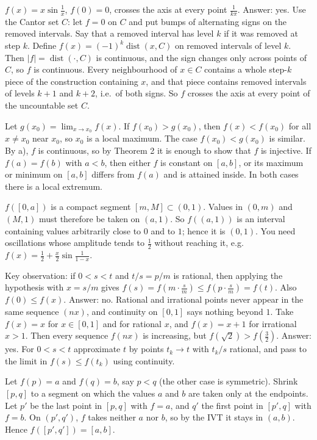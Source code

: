 \documentclass[11pt,a4paper]{article}
\begin{document}
 $f(x)=x\sin\frac1x$, $f(0)=0$, crosses the axis at every point $\frac1{k\pi}$.
 Answer: yes. Use the Cantor set $C$: let $f=0$ on $C$ and put bumps of alternating signs on the removed intervals.
 Say that a removed interval has level $k$ if it was removed at step $k$. Define $f(x)=(-1)^k\operatorname{dist}(x,C)$ on removed intervals of level $k$. Then $|f|=\operatorname{dist}(\cdot,C)$ is continuous, and the sign changes only across points of $C$, so $f$ is continuous.
 Every neighbourhood of $x\in C$ contains a whole step-$k$ piece of the construction containing $x$, and that piece contains removed intervals of levels $k+1$ and $k+2$, i.e.\ of both signs. So $f$ crosses the axis at every point of the uncountable set $C$.

 Let $g(x_0)=\lim_{x\to x_0}f(x)$. If $f(x_0)>g(x_0)$, then $f(x)<f(x_0)$ for all $x\ne x_0$ near $x_0$, so $x_0$ is a local maximum. The case $f(x_0)<g(x_0)$ is similar.
 By a), $f$ is continuous, so by Theorem 2 it is enough to show that $f$ is injective.
 If $f(a)=f(b)$ with $a<b$, then either $f$ is constant on $[a,b]$, or its maximum or minimum on $[a,b]$ differs from $f(a)$ and is attained inside. In both cases there is a local extremum.

 $f([0,a])$ is a compact segment $[m,M]\subset(0,1)$. Values in $(0,m)$ and $(M,1)$ must therefore be taken on $(a,1)$.
 So $f((a,1))$ is an interval containing values arbitrarily close to $0$ and to $1$; hence it is $(0,1)$.
 You need oscillations whose amplitude tends to $\frac12$ without reaching it, e.g.\ $f(x)=\frac12+\frac x2\sin\frac1{1-x}$.

 Key observation: if $0<s<t$ and $t/s=p/m$ is rational, then applying the hypothesis with $x=s/m$ gives $f(s)=f(m\cdot\frac sm)\le f(p\cdot\frac sm)=f(t)$. Also $f(0)\le f(x)$.
 Answer: no. Rational and irrational points never appear in the same sequence $(nx)$, and continuity on $[0,1]$ says nothing beyond $1$.
 Take $f(x)=x$ for $x\in[0,1]$ and for rational $x$, and $f(x)=x+1$ for irrational $x>1$. Then every sequence $f(nx)$ is increasing, but $f(\sqrt2)>f(\frac32)$.
 Answer: yes. For $0<s<t$ approximate $t$ by points $t_k\to t$ with $t_k/s$ rational, and pass to the limit in $f(s)\le f(t_k)$ using continuity.

 Let $f(p)=a$ and $f(q)=b$, say $p<q$ (the other case is symmetric). Shrink $[p,q]$ to a segment on which the values $a$ and $b$ are taken only at the endpoints.
 Let $p'$ be the last point in $[p,q]$ with $f=a$, and $q'$ the first point in $[p',q]$ with $f=b$. On $(p',q')$, $f$ takes neither $a$ nor $b$, so by the IVT it stays in $(a,b)$. Hence $f([p',q'])=[a,b]$.
\end{document}
